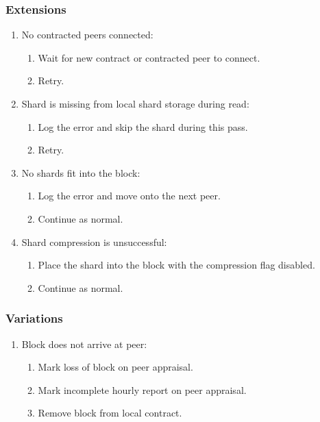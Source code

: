 \documentclass[11pt, a4paper, twoside]{report}
\begin{document}
\subsubsection{Extensions}
\begin{enumerate}
  \item No contracted peers connected:
	\begin{enumerate}
	  \item Wait for new contract or contracted peer to connect.
	  \item Retry.
	\end{enumerate}
  \item Shard is missing from local shard storage during read:
	\begin{enumerate}
	  \item Log the error and skip the shard during this pass.
	  \item Retry.
	\end{enumerate}
  \item No shards fit into the block:
	\begin{enumerate}
	  \item Log the error and move onto the next peer.
	  \item Continue as normal.
	\end{enumerate}
  \item Shard compression is unsuccessful:
	\begin{enumerate}
	  \item Place the shard into the block with the compression flag disabled.
	  \item Continue as normal.
	\end{enumerate}
\end{enumerate}

\subsubsection{Variations}
\begin{enumerate}
  \item Block does not arrive at peer:
	\begin{enumerate}
	  \item Mark loss of block on peer appraisal.
	  \item Mark incomplete hourly report on peer appraisal.
	  \item Remove block from local contract.
	\end{enumerate}
\end{enumerate}
\end{document}
